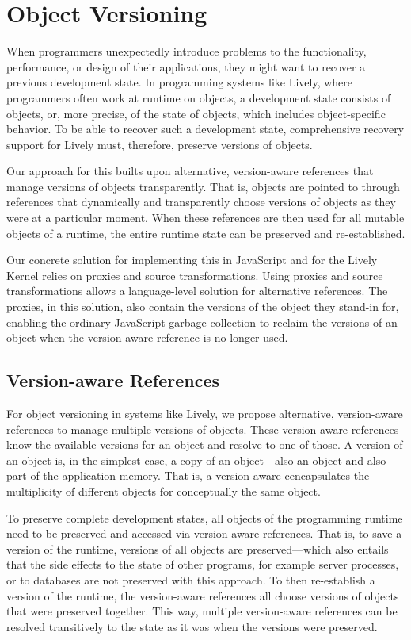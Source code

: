 \chapter{Object Versioning} \label{chapter:APPROACH}

When programmers unexpectedly introduce problems to the functionality, performance, or design of their applications, they might want to recover a previous development state.
In programming systems like Lively, where programmers often work at runtime on objects, a development state consists of objects, or, more precise, of the state of objects, which includes object-specific behavior.
To be able to recover such a development state, comprehensive recovery support for Lively must, therefore, preserve versions of objects.

Our approach for this builts upon alternative, version-aware references that manage versions of objects transparently.
That is, objects are pointed to through references that dynamically and transparently choose versions of objects as they were at a particular moment.
When these references are then used for all mutable objects of a runtime, the entire runtime state can be preserved and re-established.

Our concrete solution for implementing this in JavaScript and for the Lively Kernel relies on proxies and source transformations.
Using proxies and source transformations allows a language-level solution for alternative references.
The proxies, in this solution, also contain the versions of the object they stand-in for, enabling the ordinary JavaScript garbage collection to reclaim the versions of an object when the version-aware reference is no longer used.



\section{Version-aware References} \label{sec:APPROACH:1}

For object versioning in systems like Lively, we propose alternative, version-aware references to manage multiple versions of objects.
These version-aware references know the available versions for an object and resolve to one of those.
A version of an object is, in the simplest case, a copy of an object---also an object and also part of the application memory.
That is, a version-aware cencapsulates the multiplicity of different objects for conceptually the same object.

To preserve complete development states, all objects of the programming runtime need to be preserved and accessed via version-aware references.
That is, to save a version of the runtime, versions of all objects are preserved---which also entails that the side effects to the state of other programs, for example server processes, or to databases are not preserved with this approach.
To then re-establish a version of the runtime, the version-aware references all choose versions of objects that were preserved together.
This way, multiple version-aware references can be resolved transitively to the state as it was when the versions were preserved.

